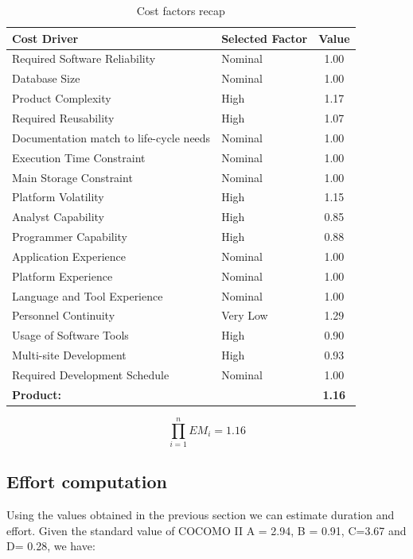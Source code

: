\begin{table}[!h]
\centering
\caption{Cost factors recap}
\label{costdriver-recap}
\begin{tabularx}{\linewidth}{XXc}
\hline
\textbf{Cost Driver}                & \textbf{Selected Factor} & \textbf{Value} \\ \hline
Required Software Reliability       & Nominal                  & 1.00 \\
Database Size                       & Nominal                  & 1.00 \\
Product Complexity                  & High                     & 1.17 \\
Required Reusability                & High                     & 1.07 \\
Documentation match to life-cycle needs & Nominal              & 1.00 \\
Execution Time Constraint           & Nominal                  & 1.00 \\
Main Storage Constraint             & Nominal                  & 1.00 \\
Platform Volatility                 & High                     & 1.15 \\
Analyst Capability                  & High                     & 0.85 \\
Programmer Capability               & High                     & 0.88 \\
Application Experience              & Nominal                  & 1.00 \\
Platform Experience                 & Nominal                  & 1.00 \\
Language and Tool Experience        & Nominal                  & 1.00 \\
Personnel Continuity                & Very Low                 & 1.29 \\
Usage of Software Tools             & High                     & 0.90 \\
Multi-site Development              & High                     & 0.93 \\
Required Development Schedule       & Nominal                  & 1.00 \\ \hline
\textbf{Product:}                   &                          & \textbf{1.16}
\end{tabularx}
\end{table}

\[ \prod_{i=1}^nEM_{i} = 1.16 \]

\subsection{Effort computation}
Using the values obtained in the previous section we can estimate duration and effort.
Given the standard value of COCOMO II A = 2.94, B = 0.91, C=3.67 and D= 0.28, we have:

